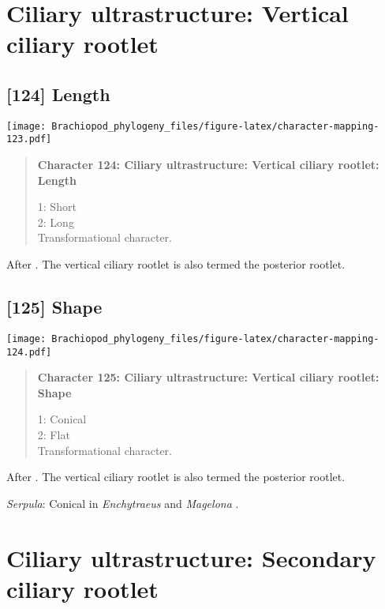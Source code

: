 \documentclass[openany]{book}
\theoremstyle{definition}
\theoremstyle{definition}
\theoremstyle{definition}
\theoremstyle{remark}
\begin{document}
\section{Ciliary ultrastructure: Vertical ciliary
rootlet}\label{ciliary-ultrastructure-vertical-ciliary-rootlet}

\subsection*{{[}124{]} Length}\label{length}

\texttt{[image: Brachiopod\_phylogeny\_files/figure-latex/character-mapping-123.pdf]}

\begin{quote}
\textbf{Character 124: Ciliary ultrastructure: Vertical ciliary rootlet:
Length}

1: Short\\
2: Long\\
Transformational character.
\end{quote}

After \citet{Lundin2009}. The vertical ciliary rootlet is also termed
the posterior rootlet.

\subsection*{{[}125{]} Shape}\label{shape}

\texttt{[image: Brachiopod\_phylogeny\_files/figure-latex/character-mapping-124.pdf]}

\begin{quote}
\textbf{Character 125: Ciliary ultrastructure: Vertical ciliary rootlet:
Shape}

1: Conical\\
2: Flat\\
Transformational character.
\end{quote}

After \citet{Lundin2009}. The vertical ciliary rootlet is also termed
the posterior rootlet.

\hypertarget{Serpula-coding-125}{}
\emph{Serpula}: Conical in \emph{Enchytraeus} \citep{Reger1967} and
\emph{Magelona} \citep{Bartolomaeus1995}.

\section{Ciliary ultrastructure: Secondary ciliary
rootlet}\label{ciliary-ultrastructure-secondary-ciliary-rootlet}
\end{document}
